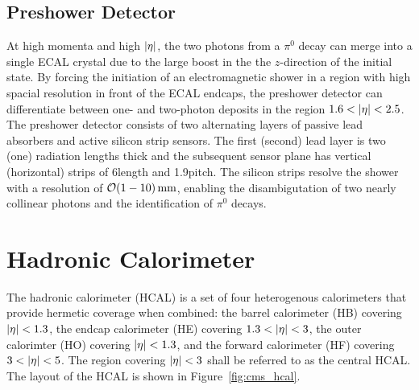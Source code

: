 \subsection{Preshower Detector}

At high momenta and high $\lvert \eta \rvert$, the two photons from a $\pi^0$ decay can merge into a single ECAL crystal due to the large boost in the the $z$-direction of the initial state.
By forcing the initiation of an electromagnetic shower in a region with high spacial resolution in front of the ECAL endcaps, the preshower detector can differentiate between one- and two-photon deposits in the region $1.6 < \lvert \eta \rvert < 2.5$.
The preshower detector consists of two alternating layers of passive lead absorbers and active silicon strip sensors.
The first (second) lead layer is two (one) radiation lengths thick and the subsequent sensor plane has vertical (horizontal) strips of 6\cm length and 1.9\mm pitch.
The silicon strips resolve the shower with a resolution of $\mathcal{O}(1-10)\,\text{mm}$, enabling the disambigutation of two nearly collinear photons and the identification of $\pi^0$ decays.

\section{Hadronic Calorimeter}

The hadronic calorimeter (HCAL) is a set of four heterogenous calorimeters that provide hermetic coverage when combined:  the barrel calorimeter (HB) covering $\lvert \eta \rvert< 1.3$, the endcap calorimeter (HE) covering $1.3 < \lvert \eta \rvert < 3$, the outer calorimter (HO) covering $\lvert \eta \rvert < 1.3$, and the forward calorimeter (HF) covering $3 < \lvert \eta \rvert < 5$.
The region covering $\lvert \eta \rvert < 3$ shall be referred to as the central HCAL. 
The layout of the HCAL is shown in Figure~\ref{fig:cms_hcal}. 

